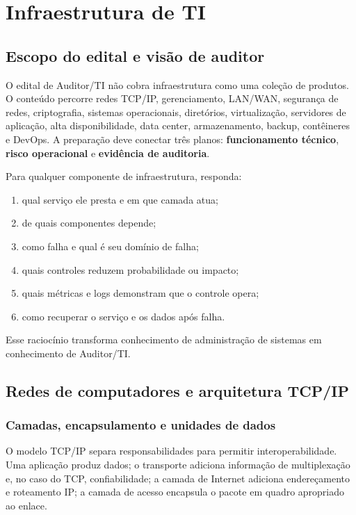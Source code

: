 \chapter{Infraestrutura de TI}

\section{Escopo do edital e visão de auditor}

O edital de Auditor/TI não cobra infraestrutura como uma coleção de produtos. O conteúdo percorre redes TCP/IP, gerenciamento, LAN/WAN, segurança de redes, criptografia, sistemas operacionais, diretórios, virtualização, servidores de aplicação, alta disponibilidade, data center, armazenamento, backup, contêineres e DevOps. A preparação deve conectar três planos: \textbf{funcionamento técnico}, \textbf{risco operacional} e \textbf{evidência de auditoria}.

\begin{teoria}
Para qualquer componente de infraestrutura, responda:
\begin{enumerate}
\item qual serviço ele presta e em que camada atua;
\item de quais componentes depende;
\item como falha e qual é seu domínio de falha;
\item quais controles reduzem probabilidade ou impacto;
\item quais métricas e logs demonstram que o controle opera;
\item como recuperar o serviço e os dados após falha.
\end{enumerate}
Esse raciocínio transforma conhecimento de administração de sistemas em conhecimento de Auditor/TI.
\end{teoria}

\section{Redes de computadores e arquitetura TCP/IP}

\subsection{Camadas, encapsulamento e unidades de dados}

O modelo TCP/IP separa responsabilidades para permitir interoperabilidade. Uma aplicação produz dados; o transporte adiciona informação de multiplexação e, no caso do TCP, confiabilidade; a camada de Internet adiciona endereçamento e roteamento IP; a camada de acesso encapsula o pacote em quadro apropriado ao enlace.

